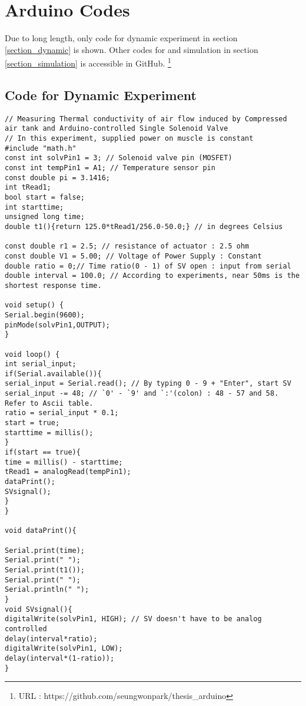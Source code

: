 \section{Arduino Codes}
Due to long length, only code for dynamic experiment in section \ref{section_dynamic} is shown. Other codes for \apc and simulation in section \ref{section_simulation} is accessible in GitHub.
\footnote{URL : https://github.com/seungwonpark/thesis\_arduino}

\subsection{Code for Dynamic Experiment}\label{code_dynamic}
\begin{scriptsize}
\begin{verbatim}
// Measuring Thermal conductivity of air flow induced by Compressed air tank and Arduino-controlled Single Solenoid Valve
// In this experiment, supplied power on muscle is constant
#include "math.h"
const int solvPin1 = 3; // Solenoid valve pin (MOSFET)
const int tempPin1 = A1; // Temperature sensor pin
const double pi = 3.1416;
int tRead1;
bool start = false;
int starttime;
unsigned long time;
double t1(){return 125.0*tRead1/256.0-50.0;} // in degrees Celsius

const double r1 = 2.5; // resistance of actuator : 2.5 ohm
const double V1 = 5.00; // Voltage of Power Supply : Constant
double ratio = 0;// Time ratio(0 - 1) of SV open : input from serial
double interval = 100.0; // According to experiments, near 50ms is the shortest response time.

void setup() {
Serial.begin(9600);
pinMode(solvPin1,OUTPUT);
}

void loop() {
int serial_input;
if(Serial.available()){ 
serial_input = Serial.read(); // By typing 0 - 9 + "Enter", start SV
serial_input -= 48; // `0' - `9' and `:'(colon) : 48 - 57 and 58. Refer to Ascii table.
ratio = serial_input * 0.1;
start = true;
starttime = millis();
}
if(start == true){
time = millis() - starttime;
tRead1 = analogRead(tempPin1);
dataPrint();
SVsignal();
}
}

void dataPrint(){

Serial.print(time);
Serial.print(" ");
Serial.print(t1());
Serial.print(" ");
Serial.println(" ");
}
void SVsignal(){
digitalWrite(solvPin1, HIGH); // SV doesn't have to be analog controlled
delay(interval*ratio);
digitalWrite(solvPin1, LOW);
delay(interval*(1-ratio));
}
\end{verbatim}
\end{scriptsize}
